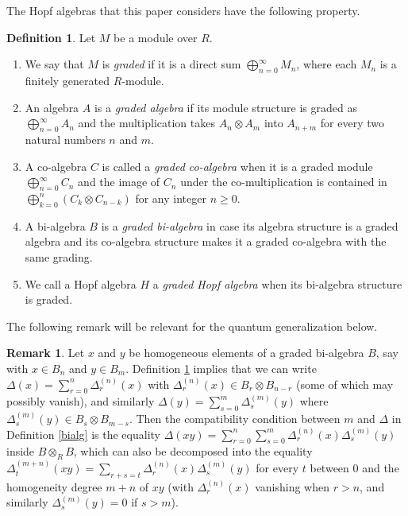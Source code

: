 \documentclass{article}
\theoremstyle{definition}
\newtheorem{defn}[thm]{Definition}
\newtheorem{rmk}[thm]{Remark}
\begin{document}
The Hopf algebras that this paper considers have the following property.
\begin{defn}
Let $M$ be a module over $R$.
\begin{enumerate}[$(i)$]
\item We say that $M$ is \emph{graded} if it is a direct sum $\bigoplus_{n=0}^{\infty}M_{n}$, where each $M_{n}$ is a finitely generated $R$-module.
\item An algebra $A$ is a \emph{graded algebra} if its module structure is graded as $\bigoplus_{n=0}^{\infty}A_{n}$ and the multiplication takes $A_{n} \otimes A_{m}$ into $A_{n+m}$ for every two natural numbers $n$ and $m$.
\item A co-algebra $C$ is called a \emph{graded co-algebra} when it is a graded module $\bigoplus_{n=0}^{\infty}C_{n}$ and the image of $C_{n}$ under the co-multiplication is contained in $\bigoplus_{k=0}^{n}(C_{k} \otimes C_{n-k})$ for any integer $n\geq0$.
\item A bi-algebra $B$ is a \emph{graded bi-algebra} in case its algebra structure is a graded algebra and its co-algebra structure makes it a graded co-algebra with the same grading.
\item We call a Hopf algebra $H$ a \emph{graded Hopf algebra} when its bi-algebra structure is graded.
\end{enumerate} \label{graded}
\end{defn}
The following remark will be relevant for the quantum generalization below.
\begin{rmk}
Let $x$ and $y$ be homogeneous elements of a graded bi-algebra $B$, say with $x \in B_{n}$ and $y \in B_{m}$. Definition \ref{graded} implies that we can write $\Delta(x)=\sum_{r=0}^{n}\Delta_{r}^{(n)}(x)$ with $\Delta_{r}^{(n)}(x) \in B_{r} \otimes B_{n-r}$ (some of which may possibly vanish), and similarly $\Delta(y)=\sum_{s=0}^{m}\Delta_{s}^{(m)}(y)$ where $\Delta_{s}^{(m)}(y) \in B_{s} \otimes B_{m-s}$. Then the compatibility condition between $m$ and $\Delta$ in Definition \ref{bialg} is the equality $\Delta(xy)=\sum_{r=0}^{n}\sum_{s=0}^{m}\Delta_{r}^{(n)}(x)\Delta_{s}^{(m)}(y)$ inside $B\otimes_{R}B$, which can also be decomposed into the equality $\Delta_{t}^{(m+n)}(xy)=\sum_{r+s=t}\Delta_{r}^{(n)}(x)\Delta_{s}^{(m)}(y)$ for every $t$ between 0 and the homogeneity degree $m+n$ of $xy$ (with $\Delta_{r}^{(n)}(x)$ vanishing when $r>n$, and similarly $\Delta_{s}^{(m)}(y)=0$ if $s>m$). \label{mDeltagr}
\end{rmk}
\end{document}
